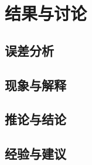\documentclass[cn,hazy,pku,12pt,normal,math=newtx,cite=super]{elegantnote}
\begin{document}

\section{结果与讨论}

\subsection{误差分析}

\subsection{现象与解释}

\subsection{推论与结论}

\subsection{经验与建议}


\end{document}
